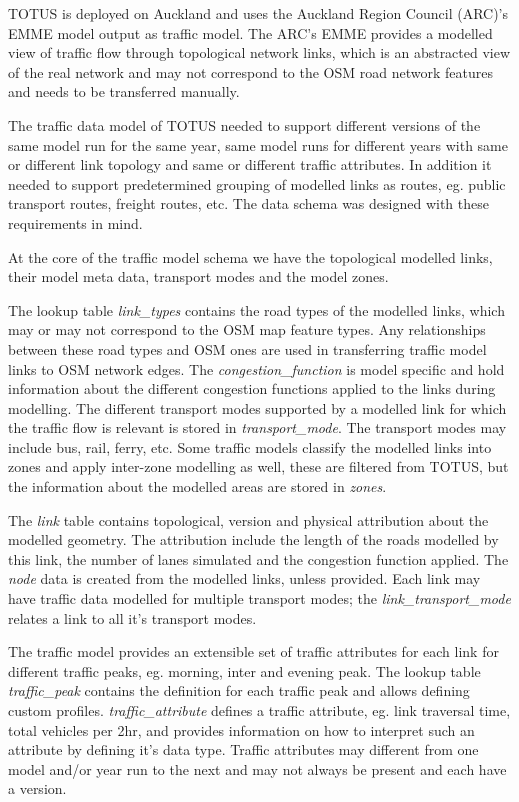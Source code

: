 TOTUS is deployed on Auckland and uses the Auckland Region Council
(ARC)'s EMME model output as traffic model. The
ARC's EMME provides a modelled view of traffic flow
through topological network links, which is an abstracted view of the
real network and may not correspond to the OSM road network features
and needs to be transferred manually.

The traffic data model of TOTUS needed to support different versions of
the same model run for the same year, same model runs for different
years with same or different link topology and same or different
traffic attributes. In addition it needed to support predetermined
grouping of modelled links as routes, eg. public transport routes,
freight routes, etc. The data schema was designed with these
requirements in mind.

At the core of the traffic model schema we have the topological modelled
links, their model meta data, transport modes and the model zones.

The lookup table \textit{link\_types} contains the road types
of the modelled links, which may or may not correspond to the OSM map
feature types. Any relationships between these road types and OSM ones
are used in transferring traffic model links to OSM network edges. The
\textit{congestion\_function} is model specific and hold
information about the different congestion functions applied to the
links during modelling. The different transport modes supported by a
modelled link for which the traffic flow is relevant is stored in
\textit{transport\_mode}. The transport modes may include
bus, rail, ferry, etc. Some traffic models classify the modelled links
into zones and apply inter-zone modelling as well, these are filtered
from TOTUS, but the information about the modelled areas are stored in
\textit{zones}.

The \textit{link} table contains topological, version and
physical attribution about the modelled geometry. The attribution
include the length of the roads modelled by this link, the number of
lanes simulated and the congestion function applied. The
\textit{node} data is created from the modelled links,
unless provided. Each link may have traffic data modelled for multiple
transport modes; the \textit{link\_transport\_mode} relates
a link to all it's transport modes.

The traffic model provides an extensible set of traffic attributes for
each link for different traffic peaks, eg. morning, inter and evening
peak. The lookup table \textit{traffic\_peak} contains the
definition for each traffic peak and allows defining custom profiles.
\textit{traffic\_attribute} defines a traffic attribute, eg.
link traversal time, total vehicles per 2hr, and provides information
on how to interpret such an attribute by defining it's
data type. Traffic attributes may different from one model and/or year
run to the next and may not always be present and each have a version.


